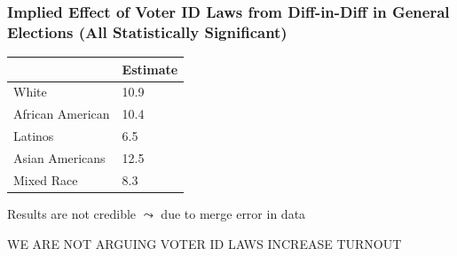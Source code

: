 \documentclass{beamer}
\numberwithin{equation}{section}
\begin{document}
\begin{frame}
\frametitle{Implied Effect of Voter ID Laws from Diff-in-Diff in General Elections (All Statistically Significant)}

\begin{tabular}{|ll|}
\hline \hline
		 & Estimate \\
\hline
White 			& 10.9 \\
\hline
African American &  10.4 \\
\hline
Latinos & 6.5  \\
\hline
Asian Americans & 12.5 \\
\hline
Mixed Race & 8.3 \\
\hline \hline
\end{tabular}

\end{frame}


\begin{frame}

\huge
Results are not credible $\leadsto$ due to merge error in data

\end{frame}

\begin{frame}
\Huge
\alert{WE ARE NOT ARGUING VOTER ID LAWS INCREASE TURNOUT}


\end{frame}
\end{document}
